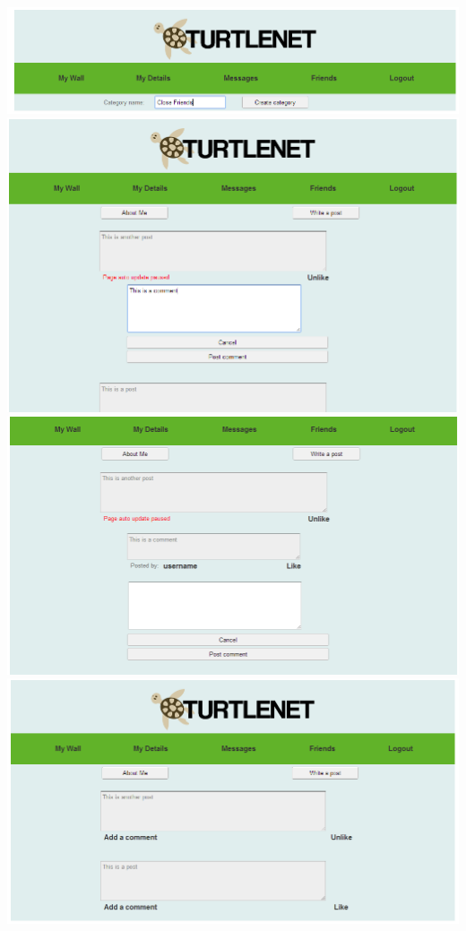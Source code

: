 \includegraphics[scale=0.2]{images/screenshots/crop5.png}
\includegraphics[scale=0.2]{images/screenshots/crop6.png}
\includegraphics[scale=0.2]{images/screenshots/crop7.png}
\includegraphics[scale=0.2]{images/screenshots/crop8.png}

